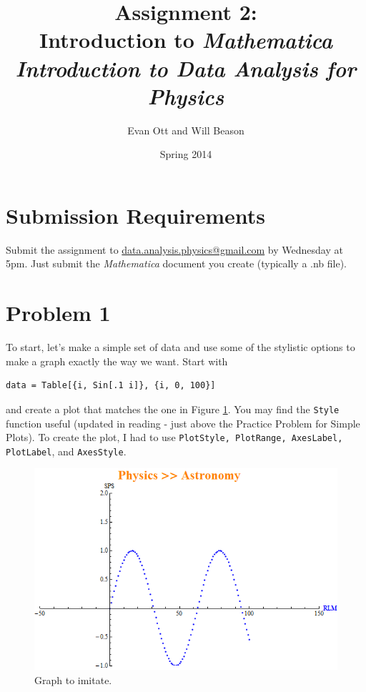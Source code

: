 \documentclass{article}
\title{Assignment 2: \\ Introduction to \emph{Mathematica}\\
\large \emph{Introduction to Data Analysis for Physics}}
\author{Evan Ott and Will Beason}
\date{Spring 2014}
\begin{document}
\maketitle
\section{Submission Requirements}
Submit the assignment to \href{mailto:data.analysis.physics@gmail.com}{data.analysis.physics@gmail.com} by Wednesday at 5pm. Just submit the \emph{Mathematica}
document you create (typically a .nb file).

\section{Problem 1}
To start, let's make a simple set of data and use some of the stylistic options to make a graph exactly the way we want. Start with
\begin{verbatim}
data = Table[{i, Sin[.1 i]}, {i, 0, 100}]
\end{verbatim}
and create a plot that matches the one in Figure \ref{fig:listplot}. You may find the \texttt{Style} function useful (updated in reading - just above the Practice Problem for Simple Plots).
To create the plot, I had to use \texttt{PlotStyle, PlotRange, AxesLabel, PlotLabel}, and \texttt{AxesStyle}.

\begin{figure}
\includegraphics[scale=.6]{physics_astro.png}
\caption{Graph to imitate.}
\label{fig:listplot}
\end{figure}
\end{document}
